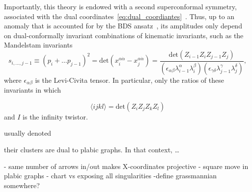 \documentclass[11pt]{article}
\def\ket#1{\langle #1 \rangle}
\begin{document}
Importantly, this theory is endowed with a second superconformal symmetry, associated with the dual coordinates~\eqref{eq:dual_coordiantes}~\cite{Drummond:2006rz,Bern:2006ew,Bern:2007ct,Alday:2007hr,Drummond:2008vq}. Thus, up to an anomaly that is accounted for by the BDS ansatz~\cite{}, its amplitudes only depend on dual-conformally invariant combinations of kinematic invariants, such as the Mandelstam invariants
\begin{equation}
s_{i,\dots,j-1} \equiv (p_i + \dots p_{j-1})^2= \text{det}(x_i^{\alpha \dot \alpha} - x_j^{\alpha \dot \alpha}) = \frac{\text{det}(Z_{i-1} Z_i Z_{j-1} Z_j)}{(\epsilon_{\alpha \beta} \lambda^\alpha_{i-1} \lambda^\beta_i) (\epsilon_{\gamma \delta} \lambda^\gamma_{j-1} \lambda^\delta_j)},
\end{equation}
where $\epsilon_{\alpha \beta}$ is the Levi-Civita tensor. In particular, only the ratios of these invariants in which   

\begin{equation}
\ket{i j k l} = \text{det}(Z_i Z_j Z_k Z_l)
\end{equation}
and $I$ is the infinity twistor.



usually denoted


their clusters are dual to plabic graphs. In that context, \dots

- same number of arrows in/out makes X-coordinates projective 
- square move in plabic graphs
- chart vs exposing all singularities 
-define grassmannian somewhere?
\end{document}
